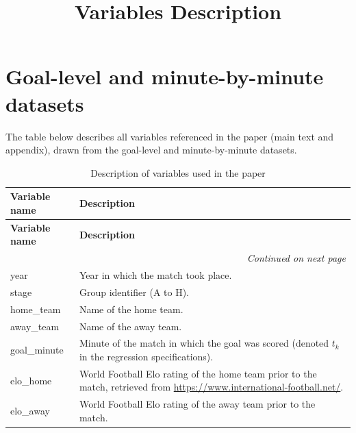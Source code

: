 \documentclass[11pt,a4paper]{article}
\title{Variables Description}
\author{}
\date{}
\begin{document}
\maketitle


\section*{Goal-level and minute-by-minute datasets}

The table below describes all variables referenced in the paper (main text and appendix), drawn from the goal-level and minute-by-minute datasets.

\bigskip

\begin{longtable}{p{4.5cm} p{10.5cm}}
\caption{Description of variables used in the paper}
\label{tab:variables_description} \\
\toprule
\textbf{Variable name} & \textbf{Description} \\
\midrule
\endfirsthead

\toprule
\textbf{Variable name} & \textbf{Description} \\
\midrule
\endhead

\midrule
\multicolumn{2}{r}{\textit{Continued on next page}} \\
\endfoot

\bottomrule
\endlastfoot

year &
Year in which the match took place. \\

stage &
Group identifier (A to H). \\

home\_team &
Name of the home team. \\

away\_team &
Name of the away team. \\

goal\_minute &
Minute of the match in which the goal was scored (denoted $t_k$ in the regression specifications). \\

elo\_home &
World Football Elo rating of the home team prior to the match, retrieved from \url{https://www.international-football.net/}. \\

elo\_away &
World Football Elo rating of the away team prior to the match. \\


\end{longtable}
\end{document}
